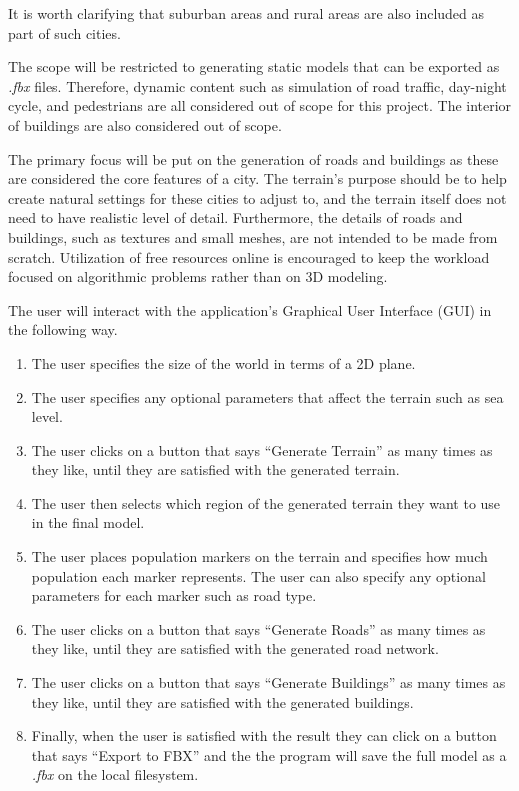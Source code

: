 It is worth clarifying that suburban areas and rural areas are also included as
part of such cities.

The scope will be restricted to generating static models that can be exported as \textit{.fbx} files.
Therefore, dynamic content such as simulation of road traffic, day-night cycle,
and pedestrians are all considered out of scope for this project.
The interior of buildings are also considered out of scope.

The primary focus will be put on the generation of roads and buildings as these
are considered the core features of a city.
The terrain's purpose should be to help create natural
settings for these cities to adjust to, and the terrain itself does not need
to have realistic level of detail. Furthermore, the details of roads and
buildings, such as textures and small meshes, are not intended to be made from
scratch. Utilization of free resources online is encouraged to keep the workload
focused on algorithmic problems rather than on 3D modeling.

The user will interact with the application's Graphical User Interface (GUI) in the following way.
\begin{enumerate}
  \item The user specifies the size of the world in terms of a 2D plane.
  \item The user specifies any optional parameters that affect the terrain
    such as sea level.
  \item The user clicks on a button that says ``Generate Terrain'' as many times
    as they like, until they are satisfied with the generated terrain.
  \item The user then selects which region of the generated terrain they want to use in the final model.
  \item The user places population markers on the terrain and specifies how much
    population each marker represents. The user can also specify any optional
    parameters for each marker such as road type.
  \item The user clicks on a button that says ``Generate Roads'' as many times
    as they like, until they are satisfied with the generated road network.
  \item The user clicks on a button that says ``Generate Buildings'' as many times
    as they like, until they are satisfied with the generated buildings.
  \item Finally, when the user is satisfied with the result they can click on a
    button that says ``Export to FBX'' and the the program will save the full
    model as a \textit{.fbx} on the local filesystem.
\end{enumerate}

